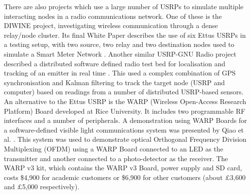 \documentclass[../main.tex]{subfiles}
\begin{document}
There are also projects which use a large number of USRPs to simulate multiple interacting nodes in a radio communications network.
One of these is the DIWINE project, investigating wireless communication through a dense relay/node cluster.
Its final White Paper describes the use of six Ettus USRPs in a testing setup, with two source, two relay and two destination nodes used to simulate a Smart Meter Network \cite{pap_DIWINEpaper4}.
Another similar USRP-GNU Radio project described a distributed software defined radio test bed for localisation and tracking of an emitter in real time \cite{pap_SDRTB_Localisation}.
This used a complex combination of GPS synchronisation and Kalman filtering to track the target node (USRP and computer) based on readings from a number of distributed USRP-based sensors. 
An alternative to the Ettus USRP is the WARP (Wireless Open-Access Research Platform) Board developed at Rice University.
It includes two programmable RF interfaces and a number of peripherals.
A demonstration using WARP Boards for a software-defined visible light communications system was presented by Qiao et al. \cite{pap_WARP_light}.
This system was used to demonstrate optical Orthogonal Frequency Division Multiplexing (OFDM) using a WARP Board connected to an LED as the transmitter and another connected to a photo-detector as the receiver.
The WARP v3 kit, which contains the WARP v3 Board, power supply and SD card, costs \$4,900 for academic customers or \$6,900 for other customers (about $\mathsterling$3,600 and $\mathsterling$5,000 respectively).\\
\end{document}
